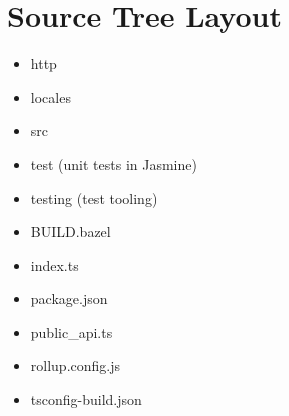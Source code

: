 \section{Source Tree Layout}


\begin{itemize}
  \item http
  \item locales
  \item src
  \item test (unit tests in Jasmine)
  \item testing (test tooling)
\end{itemize}


\begin{itemize}
  \item BUILD.bazel
  \item index.ts
  \item package.json
  \item public\_api.ts
  \item rollup.config.js
  \item tsconfig-build.json
\end{itemize}




